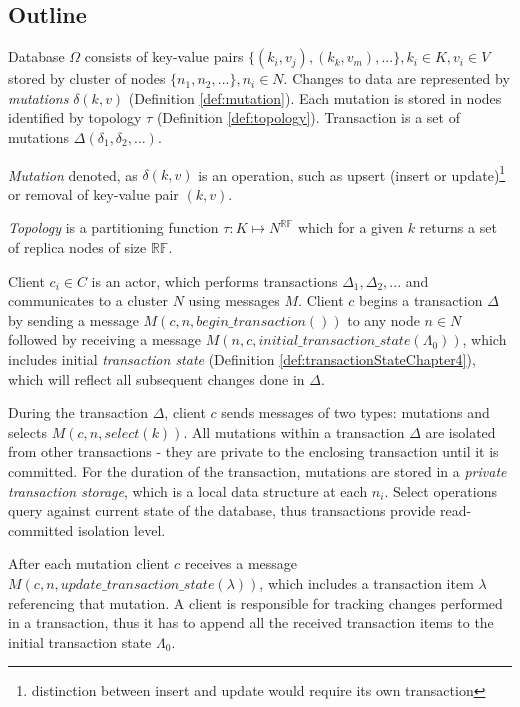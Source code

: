 \documentclass[runningheads,a4paper]{llncs}
\newcommand{\nodes}{$\mathit{N}$\xspace}
\newcommand{\transaction}{$\Delta$\xspace}
\newcommand{\beginTransactionMessage}{$\mathit{M}(c, n, \mathit{begin\_transaction}())$\xspace}
\newcommand{\initialTxStateMessage}{$\mathit{M}(n, c, \mathit{initial\_transaction\_state}(\Lambda_{0}))$\xspace}
\newcommand{\selectMessage}{$\mathit{M}(c,n,select(k))$\xspace}
\newcommand{\updateTxStateMessage}{$\mathit{M}(c, n, \mathit{update\_transaction\_state}(\lambda))$\xspace}
\newcommand{\mutation}[2]{$\delta(#1, #2)$\xspace}
\newcommand{\txItem}{$\lambda$\xspace}
\newcommand{\txStatei}[1]{$\Lambda_{#1}$\xspace}
\newcommand{\client}{$c$\xspace}
\newcommand{\node}[1]{$n_{#1}$\xspace}
\newcommand{\kv}{$(k, v)$\xspace}
\begin{document}
\subsection{Outline}
Database $\Omega$ consists of key-value pairs $\{(k_{i},v_{j}), (k_{k},v_{m}),...\}, k_i\in\mathit{K}, v_i\in\mathit{V}$ stored by cluster of nodes $\{n_1, n_2, ...\}, n_i\in\mathit{N}$.
Changes to data are represented by \emph{mutations} $\delta(k,v)$ (Definition \ref{def:mutation}). 
Each mutation is stored in nodes identified by topology $\tau$ (Definition \ref{def:topology}).
Transaction is a set of mutations $\Delta(\delta_{1}, \delta_{2}, ...)$.

\begin{definition}
  \label{def:mutation}
  \emph{Mutation} denoted, as \mutation{k}{v} is an operation, such as upsert (insert or update)\footnote{distinction between insert and update would require its own transaction} or removal of key-value pair \kv. 
\end{definition}

\begin{definition}
\label{def:topology}
\emph{Topology} is a partitioning function $\tau:\mathit{K} \mapsto \mathit{N}^{\mathbb{RF}}$ which for a given $k$ returns a set of replica nodes of size $\mathbb{RF}$. 
\end{definition}


Client $c_{i}\in\mathit{C}$ is an actor, which performs transactions $\Delta_{1}, \Delta_{2}, ...$ and communicates to a cluster \nodes using messages $\mathit{M}$. Client \client begins a transaction \transaction by sending a message \beginTransactionMessage to any node $n\in\mathit{N}$ followed by receiving a message 
\initialTxStateMessage, which includes 
initial \emph{transaction state} (Definition \ref{def:transactionStateChapter4}), which will reflect all subsequent changes done in \transaction.

During the transaction \transaction, client \client sends messages of two types:
 mutations and selects \selectMessage. 
 All mutations within a transaction \transaction are isolated from other transactions - they are private to the enclosing transaction until it is committed.
For the duration of the transaction,
mutations are stored in a \emph{private transaction storage}, which is a local data structure at each \node{i}. Select operations query against current state of the database, thus transactions provide read-committed isolation level.

After each mutation client \client receives a message \updateTxStateMessage, which includes a transaction item \txItem referencing that mutation. A client is responsible for tracking changes performed in a transaction, thus it has to append all the received transaction items to the initial transaction state \txStatei{0}.
\end{document}
